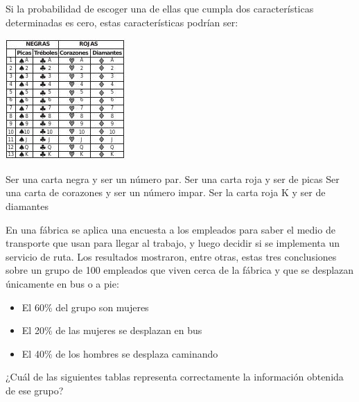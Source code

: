 \documentclass[10pt,addpoints]{exam}
\begin{document}
\begin{questions}
\begin{minipage}{.5\textwidth}
Si la probabilidad de escoger una de ellas que cumpla dos características determinadas es cero, estas características podrían ser:
\end{minipage}
\begin{minipage}{.5\textwidth}
\begin{center}
 \includegraphics{./Images/baraja.jpg}
\end{center} 
\end{minipage}
\begin{choices}
 \choice Ser una carta negra y ser un número par.
 \CorrectChoice Ser una carta roja y ser de picas
 \choice Ser una carta de corazones y ser un número impar.
 \choice Ser la carta roja K y ser de diamantes
\end{choices}
\question En una fábrica se aplica una encuesta a los empleados para saber el medio de transporte que usan para llegar al trabajo, y luego decidir si se implementa un servicio de ruta. Los resultados mostraron, entre otras, estas tres conclusiones sobre un grupo de 100 empleados que viven cerca de la fábrica y que se desplazan únicamente en bus o a pie:
\begin{itemize}
 \item El 60\% del grupo son mujeres
 \item El 20\% de las mujeres se desplazan en bus
 \item El 40\% de los hombres se desplaza caminando
\end{itemize}
¿Cuál de las siguientes tablas representa correctamente la información obtenida de ese grupo?
\begin{choices}
\end{choices}
\end{questions}
\end{document}
